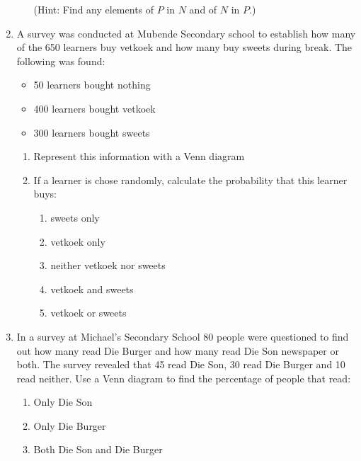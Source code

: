 \begin{eocexercises}{}
\begin{enumerate}[itemsep=5pt, label=\textbf{\arabic*}. ]
\begin{enumerate}[noitemsep, label=\textbf{(\alph*)} ]
      (Hint: Find any elements of $P$ in $N$ and of $N$ in $P$.)
    \end{enumerate}
\item A survey was conducted at Mubende Secondary school to establish how many of the 650 learners buy vetkoek and how many buy sweets during break. The following was found:
\begin{itemize}
 \item 50 learners bought nothing
\item 400 learners bought vetkoek
\item 300 learners bought sweets
\end{itemize}
\begin{enumerate}[noitemsep, label=\textbf{(\alph*)} ]
 \item Represent this information with a Venn diagram
\item If a learner is chose randomly, calculate the probability that this learner buys:
\begin{enumerate}[noitemsep, label=\textbf{(\roman*)} ]
 \item sweets only
\item vetkoek only
\item neither vetkoek nor sweets
\item vetkoek and sweets
\item vetkoek or sweets
\end{enumerate}
\end{enumerate}
\item In a survey at Michael's Secondary School 80 people were questioned to find out how many read Die Burger and how many read Die Son newspaper or both. The survey revealed that 45 read Die Son, 30 read Die Burger and 10 read neither. Use a Venn diagram to find the percentage of people that read:
\begin{enumerate}[noitemsep, label=\textbf{(\alph*)} ]
 \item Only Die Son
\item Only Die Burger
\item Both Die Son and Die Burger
\end{enumerate}
  \end{enumerate}
\end{eocexercises}


